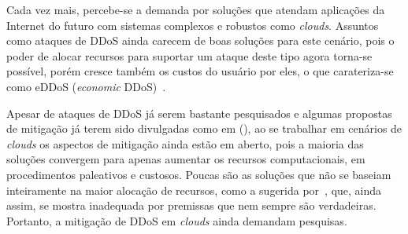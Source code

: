 \documentclass[a4paper, 11pt]{article}
\begin{document}




Cada vez mais, percebe-se a demanda por solu\c{c}\~oes que atendam
aplica\c{c}\~oes da Internet do futuro com sistemas complexos e robustos como
\emph{clouds}. Assuntos como ataques de DDoS ainda carecem de boas
solu\c{c}\~oes para este cen\'ario, pois o poder de
alocar recursos para suportar um ataque deste tipo agora torna-se
poss\'ivel, por\'em cresce tamb\'em os custos do usu\'ario por eles, o que
carateriza-se como eDDoS (\emph{economic} DDoS)~\cite{Soon:10}.
  
Apesar de ataques de DDoS j\'a serem bastante pesquisados e algumas propostas
de mitiga\c{c}\~ao j\'a terem sido divulgadas como em (\cite{Zhang:11,
Zuckerman:10,
Soon:10}), ao se trabalhar em cen\'arios de
\emph{clouds} os aspectos de mitiga\c{c}\~ao ainda est\~ao em aberto, pois
a maioria das solu\c{c}\~oes convergem para apenas aumentar os recursos computacionais, 
em procedimentos paleativos e custosos. Poucas s\~ao as soluções
que não se baseiam inteiramente na maior alocação de
recursos, como a sugerida por~\cite{Soon:10}, que, ainda assim, se mostra inadequada
por premissas que nem sempre são verdadeiras. Portanto, a
mitiga\c{c}\~ao de
DDoS em \emph{clouds} ainda demandam pesquisas.


\end{document}
